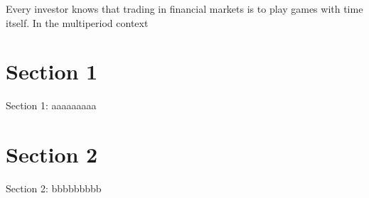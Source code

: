 \minitoc

\vspace{0.5cm}
Every investor knows that trading in financial markets is to play
games with time itself. In the multiperiod context 

\section{Section 1}
Section 1: aaaaaaaaa

\section{Section 2}
Section 2: bbbbbbbbb